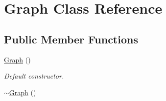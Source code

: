 \hypertarget{classGraph}{\section{Graph Class Reference}
\label{classGraph}
}
\subsection*{Public Member Functions}
\begin{DoxyCompactItemize}
\item 
\hypertarget{classGraph_ae4c72b8ac4d693c49800a4c7e273654f}{\hyperlink{classGraph_ae4c72b8ac4d693c49800a4c7e273654f}{Graph} ()}\label{classGraph_ae4c72b8ac4d693c49800a4c7e273654f}

\begin{DoxyCompactList}\small\item\em Default constructor. \end{DoxyCompactList}\item 
\hypertarget{classGraph_a902c5b3eacb66d60752525ab23297a95}{\hyperlink{classGraph_a902c5b3eacb66d60752525ab23297a95}{$\sim$\-Graph} ()}\label{classGraph_a902c5b3eacb66d60752525ab23297a95}


\end{DoxyCompactItemize}
